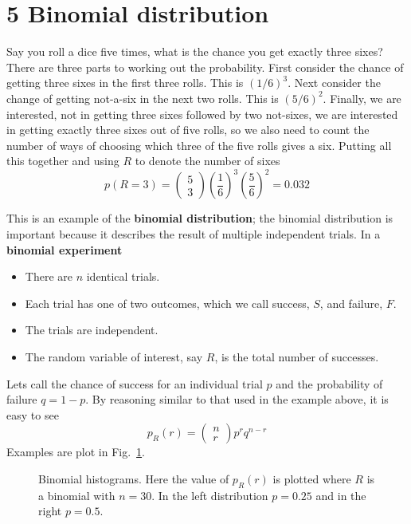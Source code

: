 \documentclass[11pt,a4paper]{scrartcl}
\begin{document}
\section*{5 Binomial distribution}

Say you roll a dice five times, what is the chance you get exactly
three sixes? There are three parts to working out the
probability. First consider the chance of getting three sixes in the
first three rolls. This is $(1/6)^3$. Next consider the change of
getting not-a-six in the next two rolls. This is $(5/6)^2$. Finally,
we are interested, not in getting three sixes followed by two
not-sixes, we are interested in getting exactly three sixes out of
five rolls, so we also need to count the number of ways of choosing
which three of the five rolls gives a six. Putting all this together
and using $R$ to denote the number of sixes
\begin{equation}
p(R=3)=\left(\begin{array}{c}5\\3\end{array}\right)\left(\frac{1}{6}\right)^3\left(\frac{5}{6}\right)^2=0.032
\end{equation}

This is an example of the \textbf{binomial distribution}; the binomial
distribution is important because it describes the result of multiple
independent trials. In a \textbf{binomial experiment}  
\begin{itemize}
\item There are $n$ identical trials.
\item Each trial has one of two outcomes, which we call success, $S$,
  and failure, $F$.
\item The trials are independent.
\item The random variable of interest, say $R$, is the total number of successes.
\end{itemize}
Lets call the chance of success for an individual trial $p$ and the
probability of failure $q=1-p$. By reasoning similar to that used in
the example above, it is easy to see
\begin{equation}
p_R(r)=\left(\begin{array}{c}n\\r\end{array}\right)p^rq^{n-r}
\end{equation}
Examples are plot in Fig.~\ref{fig_binomial}.

\begin{figure}[htb]
\begin{center}

\end{center}
\caption{Binomial histograms. Here the value of $p_R(r)$ is plotted where $R$ is a binomial with $n=30$. In the left distribution $p=0.25$ and in the right $p=0.5$.\label{fig_binomial}}
\end{figure}
\end{document}
